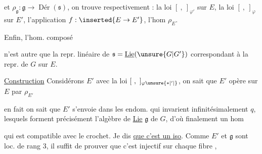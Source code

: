 et $\rho_{\mathfrak g}:\mathfrak g\longrightarrow\operatorname{Dér}(\mathfrak s)$, on trouve respectivement : la loi $[\ ,\ ]_{\varphi'}$ sur $E$, la loi $[\ ,\ ]_{\varphi}$ sur $E'$\unsure{,}, l'application $f:\inserted{E\to E'}$, l'hom $\rho_E$.

Enfin, l'hom. composé


n'est autre que la repr. linéaire de $\mathfrak s=\underline{\operatorname{Lie}}(\unsure{G|G'})$ correspondant à la repr.  de $G$ sur $E$.

\uline{Construction} Considérons $E'$ avec la loi $[\ ,\ ]_{\varphi\unsure{*|'|{}}}$, on sait que $E'$ opère sur $E$ par $\rho_{E'}$


en fait on sait que $E'$ s'envoie dans les endom.  qui invarient infinitésimalement $q$,  lesquels forment précisément l'algèbre de \uline{Lie} $\mathfrak g$ de $G$, d'où finalement un hom


qui est compatible avec le crochet. Je dis \uline{que c'est un iso}. Comme $E'$ et $\mathfrak g$ sont  loc.  de rang 3, il suffit de prouver que c'est injectif sur chaque fibre , 

